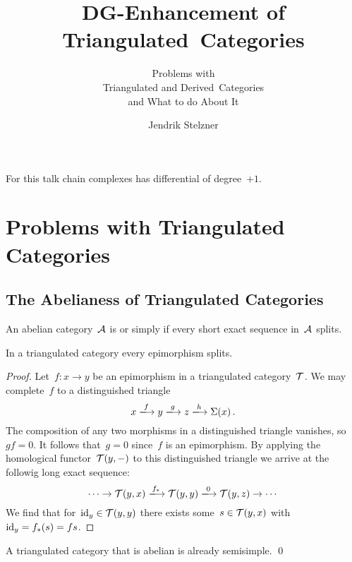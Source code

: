 \documentclass[a4paper,10pt]{scrartcl}
\title{DG-Enhancement of Triangulated~Categories}
\subtitle{Problems with \\ Triangulated and Derived~Categories \\ and What to do About It}
\author{Jendrik Stelzner}
\date{}
\begin{document}
\maketitle
  
\vspace{-1em}





For this talk chain complexes has differential of degree~$+1$.





\section{Problems with Triangulated Categories}



\subsection{The Abelianess of Triangulated Categories}

\begin{definition}
  An abelian category~$\mathcal{A}$ is  or simply  if every short exact sequence in~$\mathcal{A}$ splits.
\end{definition}

\begin{lemma}
  \label{epi in triangulated splits}
  In a triangulated category every epimorphism splits.
\end{lemma}

\begin{proof}
  Let~$f \colon x \to y$ be an epimorphism in a triangulated category~$\mathcal{T}$.
  We may complete~$f$ to a distinguished triangle
  \[
    x
    \xlongto{f}
    y
    \xlongto{g}
    z
    \xlongto{h}
    \Sigma(x) \,.
  \]
  The composition of any two morphisms in a distinguished triangle vanishes, so~$gf = 0$.
  It follows that~$g = 0$ since~$f$ is an epimorphism.
  By applying the homological functor~$\mathcal{T}(y,-)$ to this distinguished triangle we arrive at the followig long exact sequence:
  \[
    \dotsb
    \to
    \Tcat(y,x)
    \xlongto{f_*}
    \Tcat(y,y)
    \xlongto{0}
    \Tcat(y,z)
    \to
    \dotsb
  \]
  We find that for~$\mathrm{id}_y \in \mathcal{T}(y,y)$ there exists some~$s \in \mathcal{T}(y,x)$ with~$\mathrm{id}_y = f_*(s) = fs$.
\end{proof}

\begin{corollary}
  \label{triangulated abelian is semisimple}
  A triangulated category that is abelian is already semisimple.
  \qed
\end{corollary}
\end{document}
